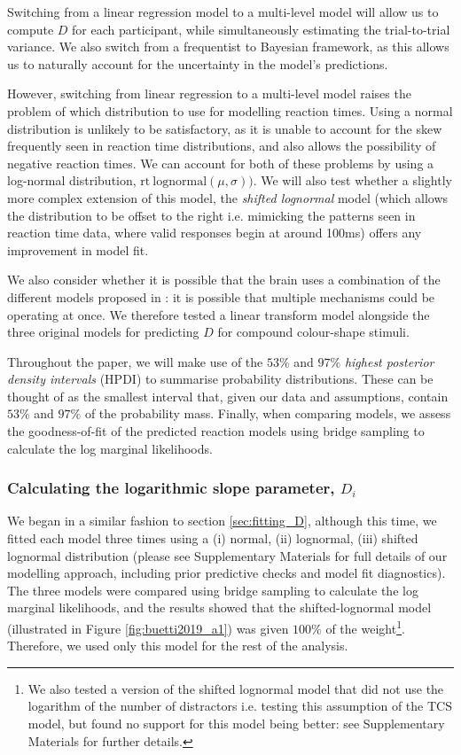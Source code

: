 \documentclass[preprint,12pt,authoryear]{elsarticle}
\begin{document}
Switching from a linear regression model to a multi-level model will allow us to compute $D$ for each participant, while simultaneously estimating the trial-to-trial variance. We also switch from a frequentist to Bayesian framework, as this allows us to naturally account for the uncertainty in the model's predictions.

However, switching from linear regression to a multi-level model raises the problem of which distribution to use for modelling reaction times. Using a normal distribution is unlikely to be satisfactory, as it is unable to account for the skew frequently seen in reaction time distributions, and also allows the possibility of negative reaction times. We can account for both of these problems by using a log-normal distribution, $\text{rt} ~ \text{lognormal}(\mu, \sigma))$. We will also test whether a slightly more complex extension of this model, the \textit{shifted lognormal} model (which allows the distribution to be offset to the right i.e. mimicking the patterns seen in reaction time data, where valid responses begin at around 100ms) offers any improvement in model fit.

We also consider whether it is possible that the brain uses a combination of the different models proposed in \cite{buetti2019predicting}: it is possible that multiple mechanisms could be operating at once. We therefore tested a linear transform model alongside the three original models for predicting $D$ for compound colour-shape stimuli.


Throughout the paper, we will make use of the $53\%$ and $97\%$ \textit{highest posterior density intervals} (HPDI) to summarise probability distributions. These can be thought of as the smallest interval that, given our data and assumptions, contain $53\%$ and $97\%$ of the probability mass. Finally, when comparing models, we assess the goodness-of-fit of the predicted reaction models using bridge sampling to calculate the log marginal likelihoods.

\subsubsection{Calculating the logarithmic slope parameter, $D_i$}

We began in a similar fashion to section \ref{sec:fitting_D}, although this time, we fitted each model three times using a (i) normal, (ii) lognormal, (iii) shifted lognormal distribution (please see Supplementary Materials for full details of our modelling approach, including prior predictive checks and model fit diagnostics). The three models were compared using bridge sampling \citep{meng1996simulating} to calculate the log marginal likelihoods, and the results showed that the shifted-lognormal model (illustrated in Figure \ref{fig:buetti2019_a1}) was given $100\%$ of the weight\footnote{We also tested a version of the shifted lognormal model that did not use the logarithm of the number of distractors i.e. testing this assumption of the TCS model, but found no support for this model being better: see Supplementary Materials for further details.}. Therefore, we used only this model for the rest of the analysis. 
\end{document}
